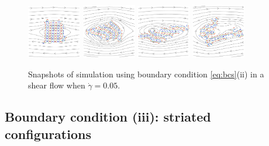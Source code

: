 \documentclass[aps,prl,preprint,groupedaddress]{revtex4-2}
\begin{document}
\begin{figure}
  \begin{center}
  \includegraphics[width=0.21\textwidth]{shear_checker_0.png}
  \includegraphics[width=0.21\textwidth]{shear_checker_250.png}
  \includegraphics[width=0.21\textwidth]{shear_checker_500.png}
  \includegraphics[width=0.21\textwidth]{shear_checker_750.png} \\
  \end{center}
  \vspace{-20pt}  
  \caption{\label{fig:shear_1} Snapshots of simulation using boundary condition \eqref{eq:bcs}(ii) in a shear flow when $\dot\gamma=0.05$. }
\end{figure}
%
\subsection{Boundary condition (iii): striated configurations} 
\end{document}
